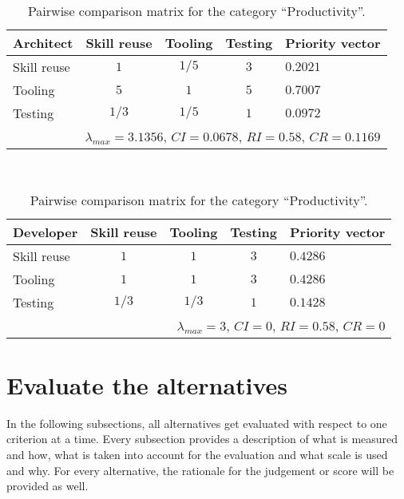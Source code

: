 \begin{table}[h!]
    \begin{center}
        \begin{tabular}{lcccl}
            \hline
            \textbf{Architect} & Skill reuse & Tooling & Testing & Priority vector \\
            \hline
            Skill reuse        & $1$         & $1/5$   & $3$     & $0.2021$        \\
            Tooling            & $5$         & $1$     & $5$     & $0.7007$        \\
            Testing            & $1/3$       & $1/5$   & $1$     & $0.0972$        \\
            \hline
            \multicolumn{5}{r}{$\lambda_{max} = 3.1356$, $CI = 0.0678$, $RI = 0.58$, $CR = 0.1169$}\\
            \hline
        \end{tabular}
        \\\vspace{1em}
        \begin{tabular}{lcccl}
            \hline
            \textbf{Developer} & Skill reuse & Tooling & Testing & Priority vector \\
            \hline
            Skill reuse        & $1$         & $1$     & $3$     & $0.4286$        \\
            Tooling            & $1$         & $1$     & $3$     & $0.4286$        \\
            Testing            & $1/3$       & $1/3$   & $1$     & $0.1428$        \\
            \hline
            \multicolumn{5}{r}{$\lambda_{max} = 3$, $CI = 0$, $RI = 0.58$, $CR = 0$}               \\
            \hline
        \end{tabular}
        \caption{Pairwise comparison matrix for the category ``Productivity''.}
        \label{tab:productivity}
    \end{center}
\end{table}




\section{Evaluate the alternatives}

In the following subsections, all alternatives get evaluated with respect to one criterion at a time. Every subsection provides a description of what is measured and how, what is taken into account for the evaluation and what scale is used and why. For every alternative, the rationale for the judgement or score will be provided as well.

